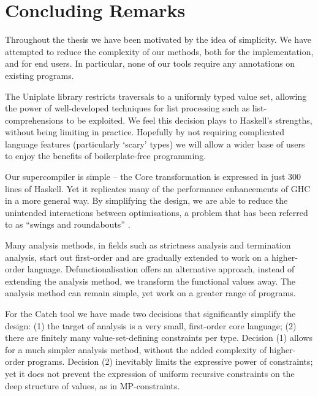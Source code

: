 \section{Concluding Remarks}
\label{sec:the_end}

Throughout the thesis we have been motivated by the idea of simplicity. We have attempted to reduce the complexity of our methods, both for the implementation, and for end users. In particular, none of our tools require any annotations on existing programs.

The Uniplate library restricts traversals to a uniformly typed value set, allowing the power of well-developed techniques for list processing such as list-comprehensions to be exploited. We feel this decision plays to Haskell's strengths, without being limiting in practice. Hopefully by not requiring complicated language features (particularly `scary' types) we will allow a wider base of users to enjoy the benefits of boilerplate-free programming.

Our supercompiler is simple -- the Core transformation is expressed in just 300 lines of Haskell. Yet it replicates many of the performance enhancements of GHC in a more general way. By simplifying the design, we are able to reduce the unintended interactions between optimisations, a problem that has been referred to as ``swings and roundabouts'' \cite{marlow:fast_curry}.

Many analysis methods, in fields such as strictness analysis and termination analysis, start out first-order and are gradually extended to work on a higher-order language. Defunctionalisation offers an alternative approach, instead of extending the analysis method, we transform the functional values away. The analysis method can remain simple, yet work on a greater range of programs.

For the Catch tool we have made two decisions that significantly simplify the design: (1) the target of analysis is a very small, first-order core language; (2) there are finitely many value-set-defining constraints per type. Decision (1) allows for a much simpler analysis method, without the added complexity of higher-order programs. Decision (2) inevitably limits the expressive power of constraints; yet it does not prevent the expression of uniform recursive constraints on the deep structure of values, as in MP-constraints.


